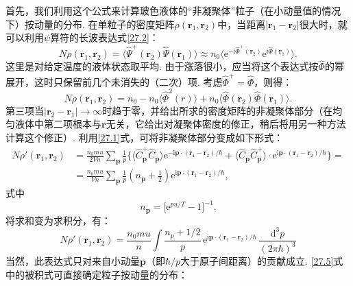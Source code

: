 首先，我们利用这个公式来计算玻色液体的“非凝聚体”粒子（在小动量值的情况下）按动量的分布. 在单粒子的密度矩阵$\rho(\bm{r}_{1},\bm{r}_{2})$中，当距离$\vert\bm{r}_{1}-\bm{r}_{2}\vert$很大时，就可以利用$\psi$算符的长波表达式\eqref{27.2}：
\begin{equation}
N\rho(\bm{r}_{1},\bm{r}_{2})
=\langle\hat{\Psi}^{+}(\bm{r}_{2})\hat{\Psi}(\bm{r}_{1})\rangle
\approx n_{0}\bigl\langle\mathrm{e}^{-\mathrm{i}\hat{\Phi}^{+}(\bm{r}_{2})}
\mathrm{e}^{\mathrm{i}\hat{\Phi}(\bm{r}_{1})}\bigr\rangle.
\label{27.3}
\end{equation}
这里是对给定温度的液体状态取平均. 由于涨落很小，应当将这个表达式按$\hat{\Phi}$的幂展开，这时只保留前几个未消失的（二次）项. 考虑$\hat{\Phi}^{+}=\hat{\Phi}$，则得：
\begin{equation}
N\rho(\bm{r}_{1},\bm{r}_{2})
=n_{0}-n_{0}\bigl\langle\hat{\Phi}^{2}(r)\bigr\rangle
+n_{0}\bigl\langle\hat{\Phi}(\bm{r}_{2})\hat{\Phi}(\bm{r}_{1})\bigr\rangle.
\label{27.4}
\end{equation}
第三项当$\vert\bm{r}_{2}-\bm{r}_{1}\vert\to\infty$时趋于零，并给出所求的密度矩阵的非凝聚体部分（在均匀液体中第二项根本与$\bm{r}$无关，它给出对凝聚体密度的修正，稍后将用另一种方法计算这个修正）. 利用\eqref{27.1}式，可将非凝聚体部分变成如下形式：
\begin{equation*}
\begin{aligned}
N\rho'(\bm{r}_{1},\bm{r}_{2})
&=\frac{n_{0}mu}{2Vn}\sum_{\bm{p}}\frac{1}{p}
\bigl\{\langle\hat{C}^{+}_{\bm{p}}\hat{C}_{\bm{p}}\rangle
\mathrm{e}^{-\mathrm{i}\bm{p}\cdot(\bm{r}_{1}-\bm{r}_{2})/\hbar}
+\langle\hat{C}_{\bm{p}}\hat{C}^{+}_{\bm{p}}\rangle\cdot
\mathrm{e}^{\mathrm{i}\bm{p}\cdot(\bm{r}_{1}-\bm{r}_{2})/\hbar}\bigr\}=\\
&=\frac{n_{0}mu}{Vn}\sum_{\bm{p}}\frac{1}{p}
\left(n_{\bm{p}}+\frac{1}{2}\right)
\mathrm{e}^{\mathrm{i}\bm{p}\cdot(\bm{r}_{1}-\bm{r}_{2})/\hbar},
\end{aligned}
\end{equation*}
式中
\begin{equation*}
n_{\bm{p}}=\bigl[\mathrm{e}^{pu/T}-1\bigr]^{-1}.
\end{equation*}
将求和变为求积分，有：
\begin{equation}
N\rho'(\bm{r}_{1},\bm{r}_{2})=\frac{n_{0}mu}{n}\int
\frac{n_{p}+1/2}{p}\,
\mathrm{e}^{\mathrm{i}\bm{p}\cdot(\bm{r}_{1}-\bm{r}_{2})/\hbar}\,
\frac{\mathrm{d}^{3}p}{(2\pi\hbar)^{3}}
\label{27.5}
\end{equation}
当然，此表达式只对来自小动量$\bm{p}$（即$\hbar/p$大于原子间距离）的贡献成立. \eqref{27.5}式中的被积式可直接确定粒子按动量的分布：
